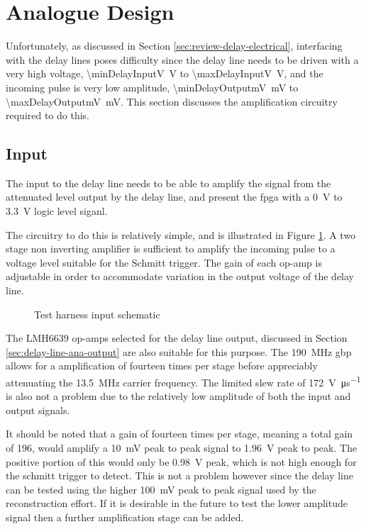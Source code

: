 \section{Analogue Design}  \label{sec:test-harness-ana}

Unfortunately, as discussed in Section \ref{sec:review-delay-electrical}, interfacing with the delay lines poses difficulty since the delay line needs to be driven with a very high voltage, \SI{\minDelayInputV}{\volt} to \SI{\maxDelayInputV}{\volt}, and the incoming pulse is very low amplitude, \SI{\minDelayOutputmV}{\milli\volt} to \SI{\maxDelayOutputmV}{\milli\volt}. This section discusses the amplification circuitry required to do this.

\subsection{Input}

The input to the delay line needs to be able to amplify the signal from the attenuated level output by the delay line, and present the \gls{fpga} with a \SI{0}{\volt} to \SI{3.3}{\volt} logic level siganl.

The circuitry to do this is relatively simple, and is illustrated in Figure \ref{fig:test-harness-input-sch}. A two stage non inverting amplifier is sufficient to amplify the incoming pulse to a voltage level suitable for the Schmitt trigger. The gain of each op-amp is adjustable in order to accommodate variation in the output voltage of the delay line.

\begin{figure}[ht]
	\centering
	\caption{Test harness input schematic }
	\label{fig:test-harness-input-sch}
\end{figure}

The LMH6639 op-amps selected for the delay line output, discussed in Section \ref{sec:delay-line-ana-output} are also suitable for this purpose. The \SI{190}{\mega\hertz} \gls{gbp} allows for a amplification of fourteen times per stage before appreciably attenuating the \SI{13.5}{\mega\hertz} carrier frequency. The limited slew rate of \SI{172}{\volt\per\micro\second} is also not a problem due to the relatively low amplitude of both the input and output signals.

It should be noted that a gain of fourteen times per stage, meaning a total gain of 196, would amplify a \SI{10}{\milli\volt} peak to peak signal to \SI{1.96}{\volt} peak to peak. The positive portion of this would only be \SI{0.98}{\volt} peak, which is not high enough for the schmitt trigger to detect. This is not a problem however since the delay line can be tested using the higher \SI{100}{\milli\volt} peak to peak signal used by the reconstruction effort. If it is desirable in the future to test the lower amplitude signal then a further amplification stage can be added.

